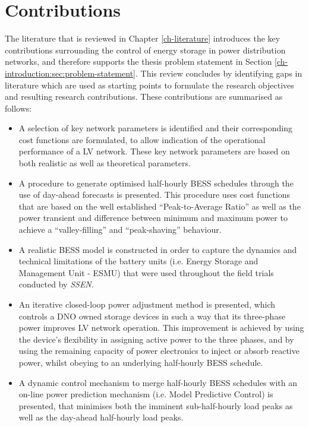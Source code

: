 \section{Contributions}
\label{ch-introduction:sec:contributions}

The literature that is reviewed in Chapter \ref{ch-literature} introduces the key contributions surrounding the control of energy storage in power distribution networks, and therefore supports the thesis problem statement in Section \ref{ch-introduction:sec:problem-statement}.
This review concludes by identifying gaps in literature which are used as starting points to formulate the research objectives and resulting research contributions.
These contributions are summarised as follows:

\begin{itemize}
	\item
	A selection of key network parameters is identified and their corresponding cost functions are formulated, to allow indication of the operational performance of a LV network.
	These key network parameters are based on both realistic as well as theoretical parameters.
	\item
	A procedure to generate optimised half-hourly BESS schedules through the use of day-ahead forecasts is presented.
	This procedure uses cost functions that are based on the well established ``Peak-to-Average Ratio'' as well as the power transient and difference between minimum and maximum power to achieve a ``valley-filling'' and ``peak-shaving'' behaviour.
	\item
	A realistic BESS model is constructed in order to capture the dynamics and technical limitations of the battery units (i.e. Energy Storage and Management Unit - ESMU) that were used throughout the field trials conducted by \textit{SSEN}.
	\item
	An iterative closed-loop power adjustment method is presented, which controls a DNO owned storage devices in such a way that its three-phase power improves LV network operation.
	This improvement is achieved by using the device's flexibility in assigning active power to the three phases, and by using the remaining capacity of power electronics to inject or absorb reactive power, whilst obeying to an underlying half-hourly BESS schedule.
	\item
	A dynamic control mechanism to merge half-hourly BESS schedules with an on-line power prediction mechanism (i.e. Model Predictive Control) is presented, that minimises both the imminent sub-half-hourly load peaks as well as the day-ahead half-hourly load peaks.

\end{itemize}

